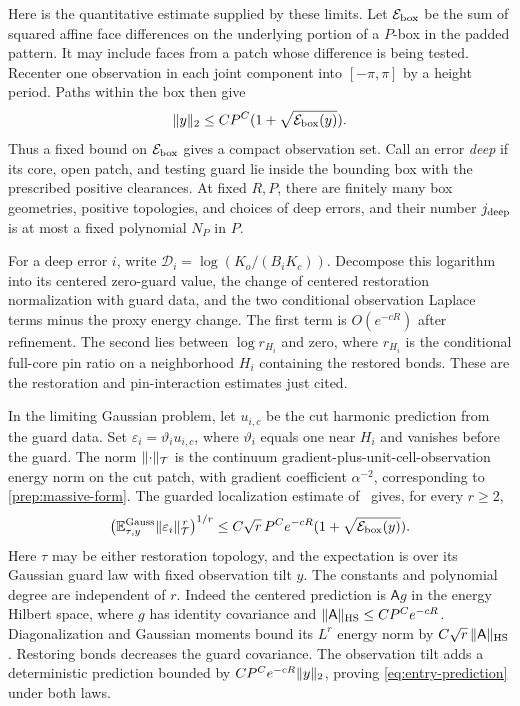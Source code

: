 Here is the quantitative estimate supplied by these limits. Let
$\mathcal E_{\rm box}$ be the sum of squared affine face differences
on the underlying portion of a $P$-box in the padded pattern.
It may include faces from a patch whose difference is being tested.
Recenter one observation in each joint component into $[-\pi,\pi]$
by a height period. Paths within the box then give
\[
       \lVert y\rVert_2\le C P^C
                          (1+\sqrt{\mathcal E_{\rm box}(y)}).
\]
Thus a fixed bound on $\mathcal E_{\rm box}$ gives a compact
observation set. Call an error \emph{deep} if its core, open patch,
and testing guard lie inside the bounding box with the prescribed
positive clearances. At fixed $R,P$, there are finitely many box
geometries, positive topologies, and choices of deep errors, and their
number $j_{\rm deep}$ is at most a fixed polynomial $N_P$ in $P$.

For a deep error $i$, write
$\mathcal D_i=\log(K_o/(B_iK_c))$.
Decompose this logarithm into its centered zero-guard value, the
change of centered restoration normalization with guard data, and
the two conditional observation Laplace terms minus the proxy
energy change. The first term is $O(e^{-cR})$ after refinement.
The second lies between $\log r_{H_i}$ and zero, where $r_{H_i}$
is the conditional full-core pin ratio on a neighborhood $H_i$
containing the restored bonds. These are the restoration and
pin-interaction estimates just cited.

In the limiting Gaussian problem, let $u_{i,c}$ be the cut harmonic
prediction from the guard data. Set
$\varepsilon_i=\vartheta_i u_{i,c}$, where $\vartheta_i$ equals
one near $H_i$ and vanishes before the guard. The norm
$\lVert\cdot\rVert_{\mathcal T}$ is the continuum
gradient-plus-unit-cell-observation energy norm on the cut patch,
with gradient coefficient $\alpha^{-2}$, corresponding to
\eqref{prep:massive-form}. The guarded localization estimate
of~\cite[Equation (9.23)]{B} gives, for every $r\ge2$,
\begin{equation}\label{eq:entry-prediction}
 \left(\mathbb E_{\tau,y}^{\rm Gauss}
                  \lVert\varepsilon_i\rVert_{\mathcal T}^{\,r}\right)^{1/r}
 \le C\sqrt r\,P^C e^{-cR}
                        (1+\sqrt{\mathcal E_{\rm box}(y)}).
\end{equation}
Here $\tau$ may be either restoration topology, and the expectation
is over its Gaussian guard law with fixed observation tilt $y$.
The constants and polynomial degree are independent of $r$.
Indeed the centered prediction is $\mathsf A g$ in the energy
Hilbert space, where $g$ has identity covariance and
$\lVert\mathsf A\rVert_{\rm HS}\le CP^C e^{-cR}$.
Diagonalization and Gaussian moments bound its $L^r$ energy norm
by $C\sqrt r\,\lVert\mathsf A\rVert_{\rm HS}$. Restoring bonds decreases
the guard covariance. The observation tilt adds a deterministic
prediction bounded by $CP^Ce^{-cR}\lVert y\rVert_2$, proving
\eqref{eq:entry-prediction} under both laws.

